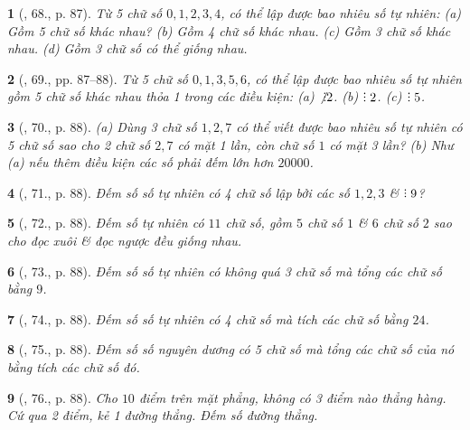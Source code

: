 \documentclass{article}
\newtheorem{baitoan}{}
\DeclareRobustCommand{\divby}{%
	\mathrel{\vbox{\baselineskip.65ex\lineskiplimit0pt\hbox{.}\hbox{.}\hbox{.}}}%
}
\begin{document}
\begin{baitoan}[\cite{Binh_Toan_6_tap_2}, 68., p. 87]
	Từ 5 chữ số $0,1,2,3,4$, có thể lập được bao nhiêu số tự nhiên: (a) Gồm 5 chữ số khác nhau? (b) Gồm 4 chữ số khác nhau. (c) Gồm 3 chữ số khác nhau. (d) Gồm 3 chữ số có thể giống nhau.
\end{baitoan}

\begin{baitoan}[\cite{Binh_Toan_6_tap_2}, 69., pp. 87--88]
	Từ 5 chữ số $0,1,3,5,6$, có thể lập được bao nhiêu số tự nhiên gồm 5 chữ số khác nhau thỏa 1 trong các điều kiện: (a) $\not{\divby}2$. (b) $\divby2$. (c) $\divby5$.
\end{baitoan}

\begin{baitoan}[\cite{Binh_Toan_6_tap_2}, 70., p. 88]
	(a) Dùng 3 chữ số $1,2,7$ có thể viết được bao nhiêu số tự nhiên có 5 chữ số sao cho 2 chữ số $2,7$ có mặt 1 lần, còn chữ số $1$ có mặt 3 lần? (b) Như (a) nếu thêm điều kiện các số phải đếm lớn hơn $20000$.
\end{baitoan}

\begin{baitoan}[\cite{Binh_Toan_6_tap_2}, 71., p. 88]
	Đếm số số tự nhiên có 4 chữ số lập bởi các số $1,2,3$ \& $\divby9$?
\end{baitoan}

\begin{baitoan}[\cite{Binh_Toan_6_tap_2}, 72., p. 88]
	Đếm số tự nhiên có $11$ chữ số, gồm $5$ chữ số $1$ \& $6$ chữ số $2$ sao cho đọc xuôi \& đọc ngược đều giống nhau.
\end{baitoan}

\begin{baitoan}[\cite{Binh_Toan_6_tap_2}, 73., p. 88]
	Đếm số số tự nhiên có không quá 3 chữ số mà tổng các chữ số bằng $9$.
\end{baitoan}

\begin{baitoan}[\cite{Binh_Toan_6_tap_2}, 74., p. 88]
	Đếm số số tự nhiên có 4 chữ số mà tích các chữ số bằng $24$.
\end{baitoan}

\begin{baitoan}[\cite{Binh_Toan_6_tap_2}, 75., p. 88]
	Đếm số số nguyên dương có 5 chữ số mà tổng các chữ số của nó bằng tích các chữ số đó.
\end{baitoan}

\begin{baitoan}[\cite{Binh_Toan_6_tap_2}, 76., p. 88]
	Cho $10$ điểm trên mặt phẳng, không có 3 điểm nào thẳng hàng. Cứ qua 2 điểm, kẻ 1 đường thẳng. Đếm số đường thẳng.
\end{baitoan}
\end{document}
